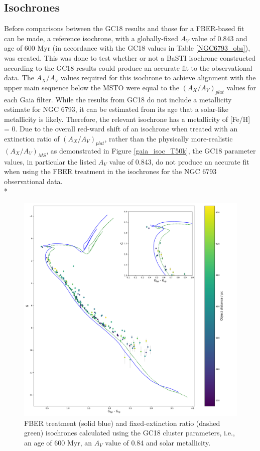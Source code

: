 \documentclass[12pt, a4paper]{report}
\begin{document}
\subsection{Isochrones}

Before comparisons between the GC18 results and those for a FBER-based fit can be made, a reference isochrone, with a globally-fixed $A_{V}$ value of 0.843 and age of 600 Myr (in accordance with the GC18 values in Table \ref{NGC6793_obs}), was created. This was done to test whether or not a BaSTI isochrone constructed according to the GC18 results could produce an accurate fit to the observational data. The $A_{X}/A_{V}$ values required for this isochrone to achieve alignment with the upper main sequence below the MSTO were equal to the $(A_{X}/A_{V})_{plat}$ values for each Gaia filter. While the results from GC18 do not include a metallicity estimate for NGC 6793, it can be estimated from its age that a solar-like metallicity is likely. Therefore, the relevant isochrone has a metallicity of [Fe/H] = 0. Due to the overall red-ward shift of an isochrone when treated with an extinction ratio of $(A_{X}/A_{V})_{plat}$, rather than the physically more-realistic $(A_{X}/A_{V})_{MS}$, as demonstrated in Figure \ref{gaia_isoc_T50k}, the GC18 parameter values, in particular the listed $A_{V}$ value of 0.843, do not produce an accurate fit when using the FBER treatment in the isochrones for the NGC 6793 observational data.\\*


\begin{figure}[h!]
\begin{center}
\includegraphics[width=1.0\textwidth]{../NGC_6793_CMD_FeH_0p002_Av_0p84_600Myr_isochrones_summary_errorbars.pdf}
\caption{FBER treatment (solid blue) and fixed-extinction ratio (dashed green) isochrones calculated using the GC18 cluster parameters, i.e., an age of 600 Myr, an $A_{V}$ value of 0.84 and solar metallicity.}
\label{NGC_6793_gc18_params_function}
\end{center}
\end{figure}
\end{document}
